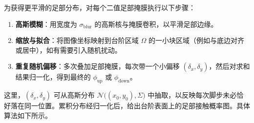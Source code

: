 \documentclass[11pt,a4paper,fontset=windows]{ctexart}
\begin{document}
为获得更平滑的足部分布，对每个二值足部掩膜执行以下步骤：

\begin{enumerate}
\item \textbf{高斯模糊}：用宽度为 $\sigma_{\text{blur}}$ 的高斯核与掩膜卷积，以平滑足部边缘。
\item \textbf{缩放与拟合}：将图像坐标映射到台阶区域 $\Omega$ 的一小块区域（例如与底边对齐或居中），如有需要引入随机扰动。
\item \textbf{重复随机偏移}：多次叠加足部掩膜，每次带一个小偏移 $(\delta_x,\delta_y)$，然后对求和结果归一化，得到最终的 $\phi_{\text{up}}$ 或 $\phi_{\text{down}}$。
\end{enumerate}

这里，$(\delta_x,\delta_y)$ 可从高斯分布 $\mathcal{N}\bigl((x_0,y_0),\Sigma\bigr)$ 中抽取，以反映每次脚步未必恰好落在同一位置。累积分布经归一化后，给出台阶表面上的足部接触概率图。具体算法如下所示。
\end{document}
